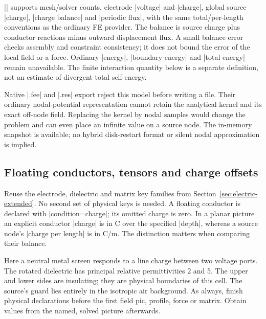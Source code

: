 |\femmelectricvalue| supports mesh/solver counts, electrode |voltage| and
|charge|, global source |charge|, |charge balance| and |periodic flux|, with the
same total/per-length conventions as the ordinary FE provider. The balance is
source charge plus conductor reactions minus outward displacement flux. A small
balance error checks assembly and constraint consistency; it does not bound the
error of the local field or a force. Ordinary |energy|, |boundary energy| and
|total energy| remain unavailable. The finite interaction quantity below is a
separate definition, not an estimate of divergent total self-energy.

Native |.fee| and |.res| export reject this model before writing a file. Their
ordinary nodal-potential representation cannot retain the analytical kernel and
its exact off-node field. Replacing the kernel by nodal samples would change the
problem and can even place an infinite value on a source node. The in-memory
snapshot is available; no hybrid disk-restart format or silent nodal
approximation is implied.

\subsection{Floating conductors, tensors and charge offsets}
\label{sec:electric-source-response}
Reuse the electrode, dielectric and matrix key families from
Section~\ref{sec:electric-extended}. No second set of physical keys is needed.
A floating conductor is declared with |condition=charge|; its omitted charge
is zero. In a planar picture an explicit conductor |charge| is in C over the
specified |depth|, whereas a source node's |charge per length| is in C/m.
The distinction matters when comparing their balance.

Here a neutral metal screen responds to a line charge between two voltage
ports. The rotated dielectric has principal relative permittivities 2 and 5.
The upper and lower sides are insulating; they are physical boundaries of
this cell. The source's guard lies entirely in the isotropic air background.
As always, finish physical declarations before the first field pic, profile,
force or matrix. Obtain values from the named, solved picture afterwards.

